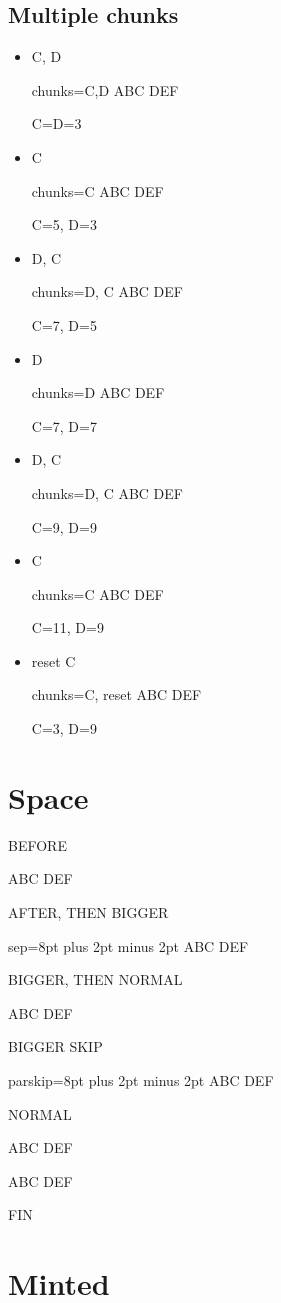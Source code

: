 \documentclass{article}
\begin{document}
\subsection{Multiple chunks}
\begin{itemize}
\item C, D
\begin{Inline}{chunks={C,D}}
ABC
DEF
\end{Inline}
C=D=3
\item C
\begin{Inline}{chunks=C}
ABC
DEF
\end{Inline}
C=5, D=3
\item D, C
\begin{Inline}{chunks={D, C}}
ABC
DEF
\end{Inline}
C=7, D=5
\item D
\begin{Inline}{chunks=D}
ABC
DEF
\end{Inline}
C=7, D=7
\item D, C
\begin{Inline}{chunks={D, C}}
ABC
DEF
\end{Inline}
C=9, D=9
\item C
\begin{Inline}{chunks={C}}
ABC
DEF
\end{Inline}
C=11, D=9
\item reset C
\begin{Inline}{chunks={C}, reset}
ABC
DEF
\end{Inline}
C=3, D=9
\end{itemize}
\section{Space}
BEFORE
\begin{Inline}{}
ABC
DEF
\end{Inline}
AFTER, THEN BIGGER
\begin{Inline}{sep=8pt plus 2pt minus 2pt}
ABC
DEF
\end{Inline}
BIGGER, THEN NORMAL
\begin{Inline}{}
ABC
DEF
\end{Inline}
BIGGER SKIP
\begin{Inline}{parskip=8pt plus 2pt minus 2pt}
ABC
DEF
\end{Inline}
NORMAL
\InlineSet{}%
\begin{Inline}{}
ABC
DEF
\end{Inline}
\begin{Inline}{}
ABC
DEF
\end{Inline}
FIN
\section{Minted}
\end{document}
